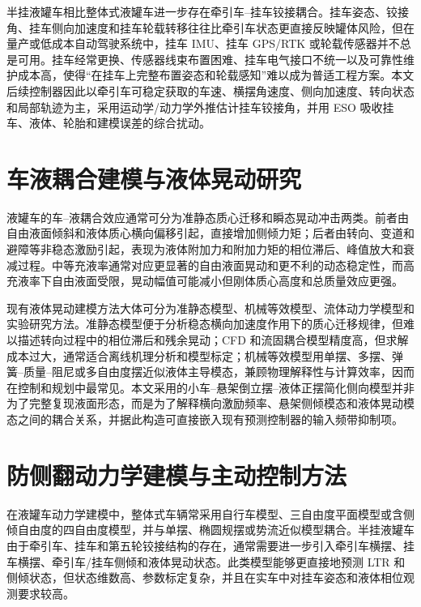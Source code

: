 \documentclass[UTF8,zihao=-4]{ctexrep}
\begin{document}
半挂液罐车相比整体式液罐车进一步存在牵引车--挂车铰接耦合。挂车姿态、铰接角、挂车侧向加速度和挂车轮载转移往往比牵引车状态更直接反映罐体风险，但在量产或低成本自动驾驶系统中，挂车 IMU、挂车 GPS/RTK 或轮载传感器并不总是可用。挂车经常更换、传感器线束布置困难、挂车电气接口不统一以及可靠性维护成本高，使得“在挂车上完整布置姿态和轮载感知”难以成为普适工程方案。本文后续控制器因此以牵引车可稳定获取的车速、横摆角速度、侧向加速度、转向状态和局部轨迹为主，采用运动学/动力学外推估计挂车铰接角，并用 ESO 吸收挂车、液体、轮胎和建模误差的综合扰动。

\section{车液耦合建模与液体晃动研究}
液罐车的车--液耦合效应通常可分为准静态质心迁移和瞬态晃动冲击两类。前者由自由液面倾斜和液体质心横向偏移引起，直接增加侧倾力矩；后者由转向、变道和避障等非稳态激励引起，表现为液体附加力和附加力矩的相位滞后、峰值放大和衰减过程\cite{maohaijian2021fsi,huangyang2017impact,wangqiongyao2017sloshing,wanying2020antirolover}。中等充液率通常对应更显著的自由液面晃动和更不利的动态稳定性，而高充液率下自由液面受限，晃动幅值可能减小但刚体质心高度和总质量效应更强\cite{wangxiaorun2022lateralacc,wangqiongyao2017sloshing,chenyibao2016crosssection}。

现有液体晃动建模方法大体可分为准静态模型、机械等效模型、流体动力学模型和实验研究方法\cite{jiaxinhong2022review}。准静态模型便于分析稳态横向加速度作用下的质心迁移规律，但难以描述转向过程中的相位滞后和残余晃动；CFD 和流固耦合模型精度高，但求解成本过大，通常适合离线机理分析和模型标定；机械等效模型用单摆、多摆、弹簧--质量--阻尼或多自由度摆近似液体主导模态，兼顾物理解释性与计算效率，因而在控制和规划中最常见\cite{salem2000rollover,yangxiujian2018multimass,wuxiangji2018sloshingmodel,Komasa2023observing}。本文采用的小车--悬架倒立摆--液体正摆简化侧向模型并非为了完整复现液面形态，而是为了解释横向激励频率、悬架侧倾模态和液体晃动模态之间的耦合关系，并据此构造可直接嵌入现有预测控制器的输入频带抑制项。

\section{防侧翻动力学建模与主动控制方法}
在液罐车动力学建模中，整体式车辆常采用自行车模型、三自由度平面模型或含侧倾自由度的四自由度模型，并与单摆、椭圆规摆或势流近似模型耦合\cite{renyuanyuan2020precisemodel,wanying2020antirolover,yuzhixin2018mpc}。半挂液罐车由于牵引车、挂车和第五轮铰接结构的存在，通常需要进一步引入牵引车横摆、挂车横摆、牵引车/挂车侧倾和液体晃动状态\cite{zongchangfu2014identification,niezhigen2015heavyduty,yuzhixin2018mpc,yuzhixin2019optimalcontrol}。此类模型能够更直接地预测 LTR 和侧倾状态，但状态维数高、参数标定复杂，并且在实车中对挂车姿态和液体相位观测要求较高。
\end{document}
